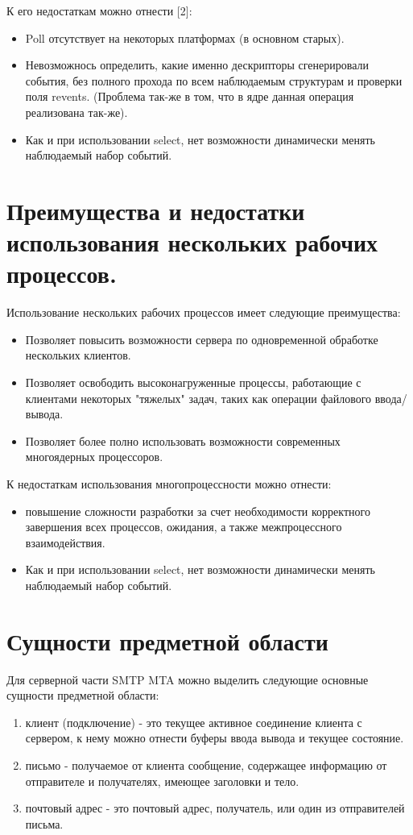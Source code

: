 \documentclass[a4paper,12pt]{report}
\begin{document}
К его недостаткам можно отнести [2]:
\begin{itemize}
 	\item Poll отсутствует на некоторых платформах (в основном старых). 
	\item Невозможнось определить, какие именно дескрипторы сгенерировали события, без полного прохода по всем наблюдаемым структурам и проверки поля revents. (Проблема так-же в том, что в ядре данная операция реализована так-же). 
	\item Как и при использовании select, нет возможности динамически менять наблюдаемый набор событий. 
\end{itemize}

\section{Преимущества и недостатки использования нескольких рабочих процессов.}

Использование нескольких рабочих процессов имеет следующие преимущества:
\begin{itemize}
	\item Позволяет повысить возможности сервера по одновременной обработке нескольких клиентов. 
	\item Позволяет освободить высоконагруженные процессы, работающие с клиентами некоторых "тяжелых" задач, таких как операции файлового ввода/вывода. 
	\item Позволяет более полно использовать возможности современных многоядерных процессоров. 
\end{itemize}

К недостаткам использования многопроцессности можно отнести:
\begin{itemize}
	\item повышение сложности разработки за счет необходимости корректного завершения всех процессов, ожидания, а также межпроцессного взаимодействия. 
	\item Как и при использовании select, нет возможности динамически менять наблюдаемый набор событий. 
\end{itemize}

\section{Сущности предметной области}

Для серверной части SMTP MTA можно выделить следующие основные сущности предметной области: 
\begin{enumerate}
	\item клиент (подключение) - это текущее активное соединение клиента с сервером, к нему можно отнести буферы ввода вывода и текущее состояние. 
	\item письмо - получаемое от клиента сообщение, содержащее информацию от отправителе и получателях, имеющее заголовки и тело.  
	\item почтовый адрес - это почтовый адрес, получатель, или один из отправителей письма. 
\end{enumerate}
\end{document}
